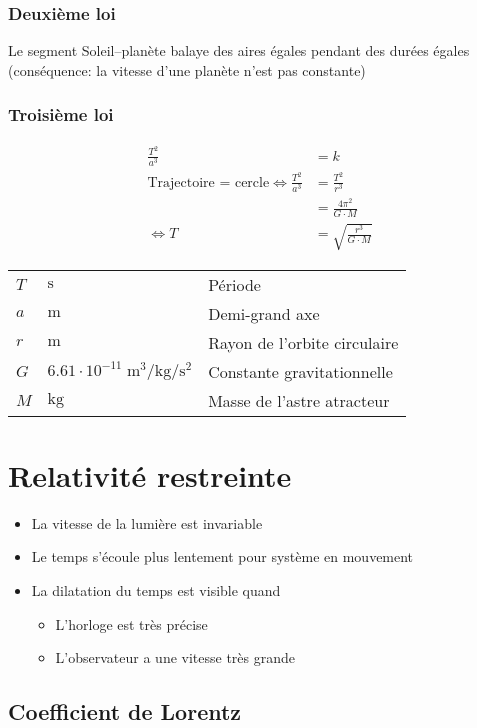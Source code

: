 \documentclass{article}
\newcommand{\deftable}[2]{%
\begin{table}[h]
    \centering
    \begin{tabular}{llp{100mm}}%
        #1
    \end{tabular}
    \label{tab:#2_units}
\end{table}%
}
\newcommand{\deftablevar}[3]{%
    $#1$ & $\si{#2}$ & #3 \\
}
\begin{document}
\subsubsection{Deuxième loi}
Le segment Soleil--planète balaye des aires égales pendant des durées égales (conséquence: la vitesse d'une planète n'est pas constante)

\subsubsection{Troisième loi}

\begin{equation*}
    \begin{split}
        \frac{T^2}{a^3} &= k \\
        \text{Trajectoire = cercle} \iff \frac{T^2}{a^3} &= \frac{T^2}{r^3} \\
        &= \frac{4\pi^2}{G\cdot M} \\
        \iff T &= \sqrt{\frac{r^3}{G\cdot M}}
    \end{split}
\end{equation*}

\deftable{
    \deftablevar{T}{\second}{Période}
    \deftablevar{a}{\meter}{Demi-grand axe}
    \deftablevar{r}{\meter}{Rayon de l'orbite circulaire}
    \deftablevar{G}{6.61\cdot10^{-11}\;\meter\cubed\per\kilo\gram\per\second\squared}{Constante gravitationnelle}
    \deftablevar{M}{\kilo\gram}{Masse de l'astre atracteur}
}{troisieme_loi_kepler}

\newpage
\section{Relativité restreinte}

\begin{itemize}
   \item La vitesse de la lumière est invariable
   \item Le temps s'écoule plus lentement pour système en mouvement
   \item La dilatation du temps est visible quand
	 \begin{itemize}
	 \item L'horloge est très précise
	 \item L'observateur a une vitesse très grande
	 \end{itemize}
\end{itemize}

\subsection{Coefficient de Lorentz}
\end{document}
